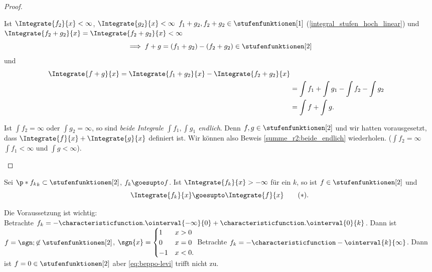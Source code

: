 \begin{proof}
\begin{proofdescription}
    \begin{eigenschaftenenumerate}[ref=\rechtsklammer{\alph*}]
      \item \label{summe_r2:beide_endlich} Ist \( \Integrate{f_2}{x}<\infty \), \( \Integrate{g_2}{x}<\infty \) \timplies \( f_1+g_2, f_2+g_2\in \stufenfunktionen[1] \) (\ref{integral_stufen_hoch_linear})  und \( \Integrate{f_2+g_2}{x}=\Integrate{f_2+g_2}{x}<\infty \)
      \begin{equation*}
        \implies f+g=(f_1+g_2)-(f_2+g_2)\in \stufenfunktionen[2]
      \end{equation*}
      und 
      \begin{align*}
        \Integrate{f+g}{x}=\Integrate{f_1+g_2}{x}-\Integrate{f_2+g_2}{x}\\
        &=\int f_1+\int g_1-\int f_2-\int g_2\\
        &=\int f+\int g.
      \end{align*}
      \item Ist \( \int f_2=\infty \) oder \( \int g_2=\infty \), so sind \emph{beide Integrale \( \int f_1,\int g_1 \) endlich}. Denn \( f,g\in \stufenfunktionen[2] \) und wir hatten vorausgesetzt, dass \( \Integrate{f}{x}+\Integrate{g}{x} \) definiert ist. Wir können also Beweis \ref{summe_r2:beide_endlich} wiederholen. (\(\int f_2=\infty\) \timplies \( \int f_1<\infty \) und \( \int g <\infty \)).
    \end{eigenschaftenenumerate}
  \end{proofdescription}
  
\end{proof}
\begin{satz} \label{beppo-levi}
  Sei \( \p*{f_k}_k\subset \stufenfunktionen[2] \), \( f_k\goesupto f \). Ist \( \Integrate{f_k}{x}>-\infty \) für ein \( k \), so ist \( f\in \stufenfunktionen[2] \) und 
  \begin{equation*}
    \label{eq:beppo-levi} \Integrate{f_k}{x}\goesupto \Integrate{f}{x}\tag{\( * \)}.
  \end{equation*}
\end{satz}
\begin{bemerkung*}
  Die Voraussetzung ist wichtig:\\
  Betrachte \( f_k=-\characteristicfunction.{\ointerval{-\infty}{0}}{}+\characteristicfunction.{\ointerval{0}{k}}{} \). Dann ist \( f=\sgn;\not\in \stufenfunktionen[2] \), \( \sgn{x}=\begin{cases}
    1&x>0\\ 0&x=0\\ -1&x<0.
  \end{cases} \)
  Betrachte \( f_k=-\characteristicfunction-{\ointerval{k}{\infty}}{} \). Dann ist \( f=0\in \stufenfunktionen[2] \) aber \eqref{eq:beppo-levi} trifft nicht zu.
\end{bemerkung*}
